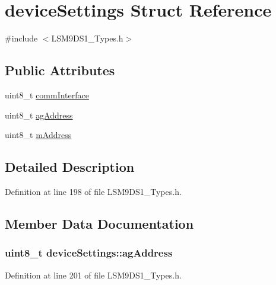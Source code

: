 \hypertarget{structdevice_settings}{}\section{device\+Settings Struct Reference}
\label{structdevice_settings}


{\ttfamily \#include $<$L\+S\+M9\+D\+S1\+\_\+\+Types.\+h$>$}

\subsection*{Public Attributes}
\begin{DoxyCompactItemize}
\item 
uint8\+\_\+t \hyperlink{structdevice_settings_a6512c63d06cce5f99760b1b3a6a4dfe9}{comm\+Interface}
\item 
uint8\+\_\+t \hyperlink{structdevice_settings_a2f43ac785e01fcbcfaf8436885f638ab}{ag\+Address}
\item 
uint8\+\_\+t \hyperlink{structdevice_settings_aec4e1d3e3f38b4e3e0f74f1640e16faa}{m\+Address}
\end{DoxyCompactItemize}


\subsection{Detailed Description}


Definition at line 198 of file L\+S\+M9\+D\+S1\+\_\+\+Types.\+h.



\subsection{Member Data Documentation}
\subsubsection[{\texorpdfstring{ag\+Address}{agAddress}}]{\setlength{\rightskip}{0pt plus 5cm}uint8\+\_\+t device\+Settings\+::ag\+Address}\hypertarget{structdevice_settings_a2f43ac785e01fcbcfaf8436885f638ab}{}\label{structdevice_settings_a2f43ac785e01fcbcfaf8436885f638ab}


Definition at line 201 of file L\+S\+M9\+D\+S1\+\_\+\+Types.\+h.

